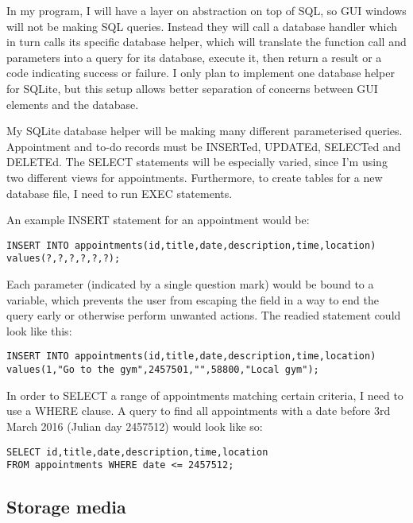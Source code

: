 In my program, I will have a layer on abstraction on top of SQL, so GUI windows
will not be making SQL queries. Instead they will call a database handler which
in turn calls its specific database helper, which will translate the function
call and parameters into a query for its database, execute it, then return a
result or a code indicating success or failure. I only plan to implement one
database helper for SQLite, but this setup allows better separation of concerns
between GUI elements and the database.

My SQLite database helper will be making many different parameterised queries.
Appointment and to-do records must be INSERTed, UPDATEd, SELECTed and DELETEd.
The SELECT statements will be especially varied, since I'm using two different
views for appointments. Furthermore, to create tables for a new database file, I
need to run EXEC statements.

An example INSERT statement for an appointment would be:

\begin{verbatim}
INSERT INTO appointments(id,title,date,description,time,location)
values(?,?,?,?,?,?);
\end{verbatim}

Each parameter (indicated by a single question mark) would be bound to a
variable, which prevents the user from escaping the field in a way to end the
query early or otherwise perform unwanted actions. The readied statement could look like this:

\begin{verbatim}
INSERT INTO appointments(id,title,date,description,time,location)
values(1,"Go to the gym",2457501,"",58800,"Local gym");
\end{verbatim}

In order to SELECT a range of appointments matching certain criteria, I need to
use a WHERE clause. A query to find all appointments with a date before 3rd
March 2016 (Julian day 2457512) would look like so:

\begin{verbatim}
SELECT id,title,date,description,time,location
FROM appointments WHERE date <= 2457512;
\end{verbatim}


\subsection{Storage media}

